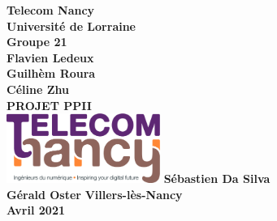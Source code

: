 


\begin{titlepage}
    \centering
    {\bfseries\large
        Telecom Nancy\\
        Université de Lorraine\\
        Groupe 21\\
        \vskip1cm
        Flavien Ledeux \\
Guilhèm Roura \\
Céline Zhu \\
    }    
    \vfill
        {\bfseries\Huge
        PROJET PPII\\
    }   
    \vfill{}
    \includegraphics[width=5cm]{logo_TNCY.png}
    \vfill{}
        {\bfseries\Large
      Sébastien Da Silva \\
Gérald Oster
    } 
    \vfill
    {\bfseries\Large
        Villers-lès-Nancy\\
        Avril 2021\\
    }   
\end{titlepage}
